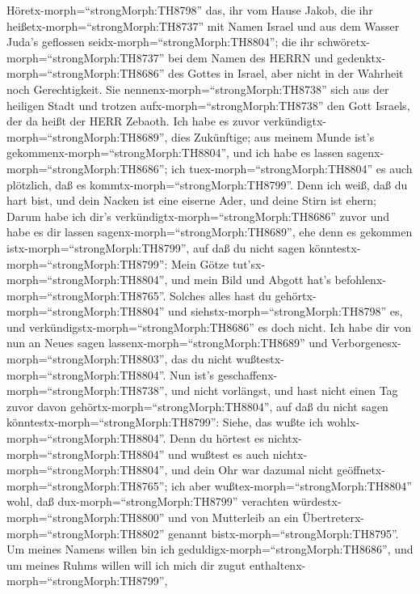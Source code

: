  Höretx-morph=``strongMorph:TH8798'' das, ihr vom Hause
Jakob, die ihr heißetx-morph=``strongMorph:TH8737'' mit Namen Israel und
aus dem Wasser Juda's geflossen seidx-morph=``strongMorph:TH8804''; die
ihr schwöretx-morph=``strongMorph:TH8737'' bei dem Namen des HERRN und
gedenktx-morph=``strongMorph:TH8686'' des Gottes in Israel, aber nicht
in der Wahrheit noch Gerechtigkeit.  Sie
nennenx-morph=``strongMorph:TH8738'' sich aus der heiligen Stadt und
trotzen aufx-morph=``strongMorph:TH8738'' den Gott Israels, der da heißt
der HERR Zebaoth.  Ich habe es zuvor
verkündigtx-morph=``strongMorph:TH8689'', dies Zukünftige; aus meinem
Munde ist's gekommenx-morph=``strongMorph:TH8804'', und ich habe es
lassen sagenx-morph=``strongMorph:TH8686''; ich
tuex-morph=``strongMorph:TH8804'' es auch plötzlich, daß es
kommtx-morph=``strongMorph:TH8799''.  Denn ich weiß, daß du
hart bist, und dein Nacken ist eine eiserne Ader, und deine Stirn ist
ehern;  Darum habe ich dir's
verkündigtx-morph=``strongMorph:TH8686'' zuvor und habe es dir lassen
sagenx-morph=``strongMorph:TH8689'', ehe denn es gekommen
istx-morph=``strongMorph:TH8799'', auf daß du nicht sagen
könntestx-morph=``strongMorph:TH8799'': Mein Götze
tut'sx-morph=``strongMorph:TH8804'', und mein Bild und Abgott hat's
befohlenx-morph=``strongMorph:TH8765''.  Solches alles hast
du gehörtx-morph=``strongMorph:TH8804'' und
siehstx-morph=``strongMorph:TH8798'' es, und
verkündigstx-morph=``strongMorph:TH8686'' es doch nicht. Ich habe dir
von nun an Neues sagen lassenx-morph=``strongMorph:TH8689'' und
Verborgenesx-morph=``strongMorph:TH8803'', das du nicht
wußtestx-morph=``strongMorph:TH8804''.  Nun ist's
geschaffenx-morph=``strongMorph:TH8738'', und nicht vorlängst, und hast
nicht einen Tag zuvor davon gehörtx-morph=``strongMorph:TH8804'', auf
daß du nicht sagen könntestx-morph=``strongMorph:TH8799'': Siehe, das
wußte ich wohlx-morph=``strongMorph:TH8804''.  Denn du
hörtest es nichtx-morph=``strongMorph:TH8804'' und wußtest es auch
nichtx-morph=``strongMorph:TH8804'', und dein Ohr war dazumal nicht
geöffnetx-morph=``strongMorph:TH8765''; ich aber
wußtex-morph=``strongMorph:TH8804'' wohl, daß
dux-morph=``strongMorph:TH8799'' verachten
würdestx-morph=``strongMorph:TH8800'' und von Mutterleib an ein
Übertreterx-morph=``strongMorph:TH8802'' genannt
bistx-morph=``strongMorph:TH8795''.  Um meines Namens willen
bin ich geduldigx-morph=``strongMorph:TH8686'', und um meines Ruhms
willen will ich mich dir zugut enthaltenx-morph=``strongMorph:TH8799'',
